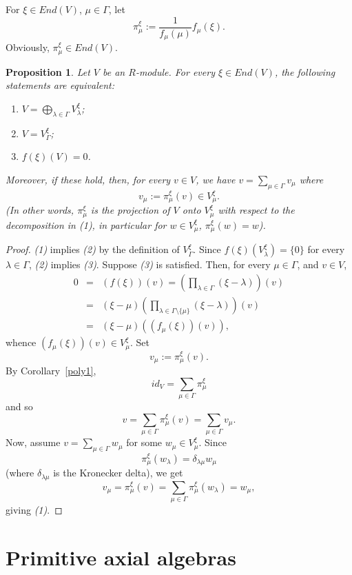 \documentclass[a4paper]{amsart}
\newtheorem{proposition}[lemma]{Proposition}
\begin{document}
For $\xi\in End(V)$, $\mu\in \Gamma$, let 
\begin{equation}\label{proj}
\pi_\mu^\xi:=\frac{1}{f_\mu(\mu)}f_\mu(\xi).
\end{equation}
Obviously, $\pi_\mu^\xi\in End(V)$.


\begin{proposition}\label{equivalence}
Let $V$ be an $R$-module. For every $\xi\in End(V)$, the following statements are equivalent:
\begin{enumerate}
\item 
$
V=\bigoplus _{\lambda \in \Gamma} V_\lambda^\xi
$;
\item $V=V_{\Gamma}^\xi$;
\item  $f(\xi)(V)=0$.
\end{enumerate}
Moreover, if these hold, then, for every $v\in V$, we have $v=\sum_{\mu\in\Gamma}v_{\mu}$ where
$$v_\mu:=\pi_\mu^\xi(v)\in V_\mu^\xi.
$$
(In other words, $\pi_\mu^\xi$ is the projection of $V$ onto $V_\mu^\xi$ with respect to the decomposition in {\it (1)}, in particular for $w\in V_\mu^\xi$, $\pi_\mu^\xi(w)=w$).
\end{proposition}
\begin{proof}
{\it (1)} implies {\it (2)} by the definition of $V_{\Gamma}^\xi$. Since $f(\xi) (V_\lambda^\xi)=\{0\}$ for every $\lambda\in \Gamma$, {\it (2)} implies {\it (3)}. Suppose {\it (3)} is satisfied. Then, for every  $\mu \in \Gamma$, and $v\in V$,
\begin{eqnarray*}
0&=&(f(\xi))(v)=\left (\prod_{\lambda\in {\Gamma}} (\xi-\lambda)\right )(v)\\
&=&(\xi-\mu)\left (\prod_{\lambda\in {\Gamma\setminus\{\mu\}}} (\xi-\lambda)\right )(v)\\
&=&(\xi-\mu)((f_\mu(\xi))(v)),
\end{eqnarray*}
whence $(f_\mu(\xi))(v)\in V_\mu^\xi$. Set
$$v_\mu:=\pi_\mu^\xi(v).
$$  
By Corollary~\ref{poly1}, 
$$id_V=
\sum_{\mu \in \Gamma} \pi_\mu^\xi
$$
and so 
$$
v=\sum_{\mu \in \Gamma} \pi_\mu^\xi(v)=\sum_{\mu\in \Gamma} v_\mu .
$$
Now, assume $v=\sum_{\mu \in \Gamma} w_\mu$ for some $w_\mu \in V_\mu^\xi$. Since   
$$
\pi_\mu^\xi(w_\lambda)=\delta_{\lambda\mu}w_\mu
$$ 
(where $\delta_{\lambda\mu}$ is the Kronecker delta), we get 
$$
v_\mu=\pi_\mu^\xi(v)=\sum_{\mu \in \Gamma}\pi_\mu^\xi(w_\lambda)=w_\mu,
$$
giving {\it (1)}.
\end{proof}

\section{Primitive axial algebras} \label{2}
\end{document}
